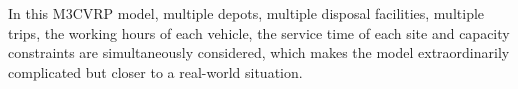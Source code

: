 \documentclass[journal]{IEEEtran}
\newcommand\checkthis[1]{\textcolor{black}{#1}}
\begin{document}
In this M3CVRP model, multiple depots, multiple disposal facilities, multiple trips, the working hours of each vehicle, the service time of each site and capacity constraints are simultaneously considered, which makes the model extraordinarily complicated but closer to a real-world situation.


	



\def\toolong{What's more, it's hard to model our UWCP as a CARP, as the information of roads is not available from our original data, thus it's not possible to construct arc between any two vertices.} 


\end{document}
